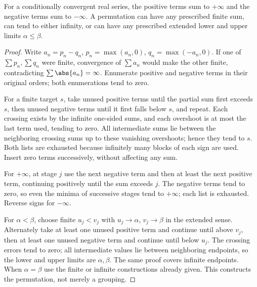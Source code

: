 \begin{theorem}
For a conditionally convergent real series, the positive terms sum to $+\infty$ and the negative terms sum to $-\infty$. A permutation can have any prescribed finite sum, can tend to either infinity, or can have any prescribed extended lower and upper limits $\alpha\leq\beta$.
\end{theorem}
\begin{proof}
Write $a_n=p_n-q_n$, $p_n=\max(a_n,0)$, $q_n=\max(-a_n,0)$. If one of $\sum p_n,\sum q_n$ were finite, convergence of $\sum a_n$ would make the other finite, contradicting $\sum\abs{a_n}=\infty$. Enumerate positive and negative terms in their original orders; both enumerations tend to zero.

For a finite target $s$, take unused positive terms until the partial sum first exceeds $s$, then unused negative terms until it first falls below $s$, and repeat. Each crossing exists by the infinite one-sided sums, and each overshoot is at most the last term used, tending to zero. All intermediate sums lie between the neighboring crossing sums up to these vanishing overshoots; hence they tend to $s$. Both lists are exhausted because infinitely many blocks of each sign are used. Insert zero terms successively, without affecting any sum.

For $+\infty$, at stage $j$ use the next negative term and then at least the next positive term, continuing positively until the sum exceeds $j$. The negative terms tend to zero, so even the minima of successive stages tend to $+\infty$; each list is exhausted. Reverse signs for $-\infty$.

For $\alpha<\beta$, choose finite $u_j<v_j$ with $u_j\to\alpha$, $v_j\to\beta$ in the extended sense. Alternately take at least one unused positive term and continue until above $v_j$, then at least one unused negative term and continue until below $u_j$. The crossing errors tend to zero; all intermediate values lie between neighboring endpoints, so the lower and upper limits are $\alpha,\beta$. The same proof covers infinite endpoints. When $\alpha=\beta$ use the finite or infinite constructions already given. This constructs the permutation, not merely a grouping.
\end{proof}

